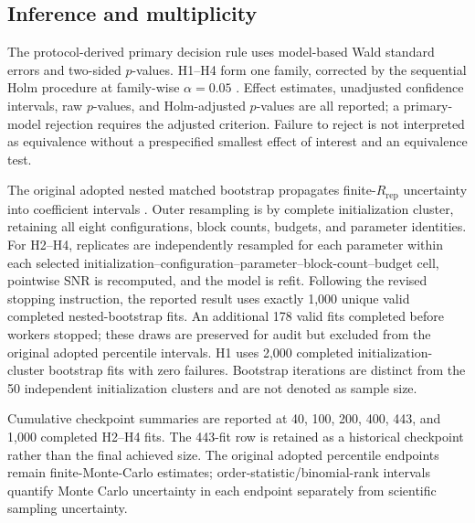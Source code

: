 \documentclass[pdflatex,sn-mathphys-num,Numbered]{sn-jnl}
\begin{document}
\subsection{Inference and multiplicity}

The protocol-derived primary decision rule uses model-based Wald standard errors and two-sided $p$-values. H1--H4 form one family, corrected by the sequential Holm procedure at family-wise $\alpha=0.05$ \cite{holm1979sequential}. Effect estimates, unadjusted confidence intervals, raw $p$-values, and Holm-adjusted $p$-values are all reported; a primary-model rejection requires the adjusted criterion. Failure to reject is not interpreted as equivalence without a prespecified smallest effect of interest and an equivalence test.

The original adopted nested matched bootstrap propagates finite-$R_{\mathrm{rep}}$ uncertainty into coefficient intervals \cite{davison1997bootstrap}. Outer resampling is by complete initialization cluster, retaining all eight configurations, block counts, budgets, and parameter identities. For H2--H4, replicates are independently resampled for each parameter within each selected initialization--configuration--parameter--block-count--budget cell, pointwise SNR is recomputed, and the model is refit. Following the revised stopping instruction, the reported result uses exactly 1,000 unique valid completed nested-bootstrap fits. An additional 178 valid fits completed before workers stopped; these draws are preserved for audit but excluded from the original adopted percentile intervals. H1 uses 2,000 completed initialization-cluster bootstrap fits with zero failures. Bootstrap iterations are distinct from the 50 independent initialization clusters and are not denoted as sample size.

Cumulative checkpoint summaries are reported at 40, 100, 200, 400, 443, and 1,000 completed H2--H4 fits. The 443-fit row is retained as a historical checkpoint rather than the final achieved size. The original adopted percentile endpoints remain finite-Monte-Carlo estimates; order-statistic/binomial-rank intervals quantify Monte Carlo uncertainty in each endpoint separately from scientific sampling uncertainty.
\end{document}
